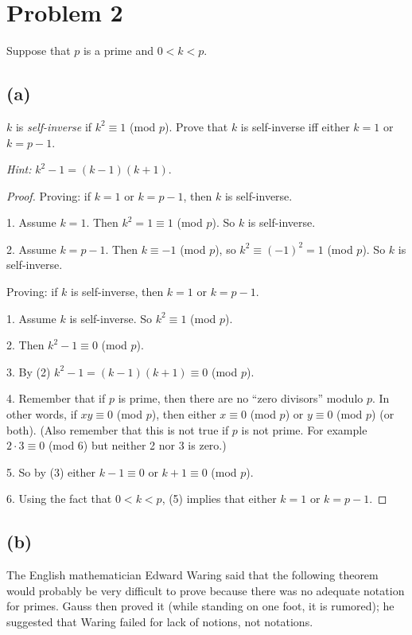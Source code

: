 \documentclass[14pt]{extarticle}
\begin{document}
\section{Problem 2}
Suppose that $p$ is a prime and $0 < k < p$.

\subsection{(a)}
$k$ is \textit{self-inverse} if $k^2 \equiv 1$ (mod $p$). Prove that $k$ is self-inverse iff either $k = 1$ or $k = p - 1$.

\textit{Hint:} $k^2 - 1 = (k - 1)(k + 1)$.

\begin{proof}
Proving: if $k = 1$ or $k = p-1$, then $k$ is self-inverse.

1. Assume $k = 1$. Then $k^2 = 1 \equiv 1$ (mod $p$). So $k$ is self-inverse.

2. Assume $k = p-1$. Then $k \equiv -1$ (mod $p$), so $k^2 \equiv (-1)^2 = 1$ (mod $p$). So $k$ is self-inverse.

Proving: if $k$ is self-inverse, then $k = 1$ or $k = p-1$.

1. Assume $k$ is self-inverse. So $k^2 \equiv 1$ (mod $p$).

2. Then $k^2 - 1 \equiv 0$ (mod $p$).

3. By (2) $k^2 - 1 = (k - 1)(k + 1) \equiv 0$ (mod $p$).

4. Remember that if $p$ is prime, then there are no ``zero divisors'' modulo $p$. In other words, if $xy \equiv 0$ (mod $p$), then either $x \equiv 0$ (mod $p$) or $y \equiv 0$ (mod $p$) (or both). (Also remember that this is not true if $p$ is not prime. For example $2 \cdot 3 \equiv 0$ (mod $6$) but neither 2 nor 3 is zero.)

5. So by (3) either $k-1 \equiv 0$ or $k+1 \equiv 0$ (mod $p$).

6. Using the fact that $0 < k < p$, (5) implies that either $k = 1$ or $k = p-1$.
\end{proof}

\subsection{(b)}
The English mathematician Edward Waring said that the following theorem would probably be very difficult to prove because there was no adequate notation for primes. Gauss then proved it (while standing
on one foot, it is rumored); he suggested that Waring failed for lack of notions, not notations.
\end{document}

